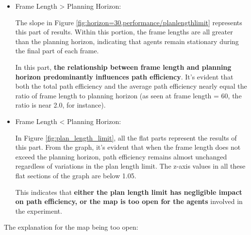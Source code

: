 \begin{itemize}
    \item Frame Length > Planning Horizon: 
    
    The slope in Figure \ref{fig:horizon=30,performance/planlengthlimit} represents this part of results. Within this portion, the frame lengths are all greater than the planning horizon, indicating that agents remain stationary during the final part of each frame.

    In this part, \textbf{the relationship between frame length and planning horizon predominantly influences path efficiency}. It's evident that both the total path efficiency and the average path efficiency nearly equal the ratio of frame length to planning horizon (as seen at frame length = 60, the ratio is near 2.0, for instance).

    \item Frame Length < Planning Horizon: 
    
    In Figure \ref{fig:plan_length_limit}, all the flat parts represent the results of this part. From the graph, it's evident that when the frame length does not exceed the planning horizon, path efficiency remains almost unchanged regardless of variations in the plan length limit. The z-axis values in all these flat sections of the graph are below 1.05.
    
    This indicates that \textbf{either the plan length limit has negligible impact on path efficiency, or the map is too open for the agents} involved in the experiment. 
    
\end{itemize}


The explanation for the map being too open: 

